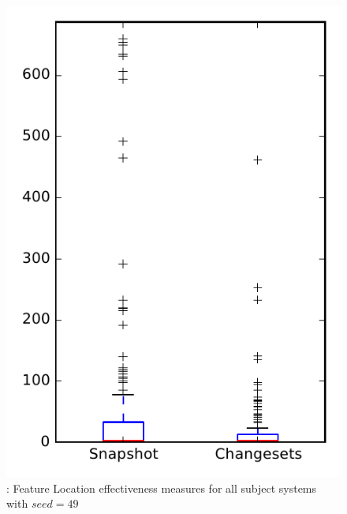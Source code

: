 
\begin{figure}
\centering
\includegraphics[height=0.4\textheight]{figures/flt_seed/rq1_overview_49}
\caption{\rone: Feature Location effectiveness measures for all subject systems with $seed=49$}
\label{fig:flt_seed:rq1:overview}
\end{figure}
